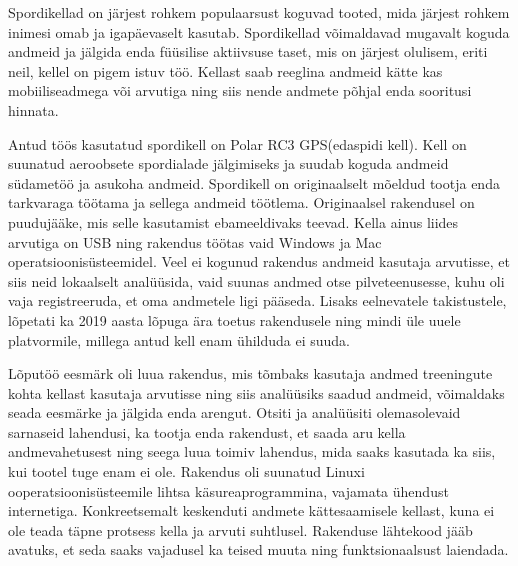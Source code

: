 Spordikellad on järjest rohkem populaarsust koguvad tooted, mida järjest rohkem inimesi omab ja igapäevaselt kasutab.
Spordikellad võimaldavad mugavalt koguda andmeid ja jälgida enda füüsilise aktiivsuse taset, mis on järjest olulisem, eriti neil, kellel on pigem istuv töö.
Kellast saab reeglina andmeid kätte kas mobiiliseadmega või arvutiga ning siis nende andmete põhjal enda sooritusi hinnata.

Antud töös kasutatud spordikell on Polar RC3 GPS(edaspidi kell).
Kell on suunatud aeroobsete spordialade jälgimiseks ja suudab koguda andmeid südametöö ja asukoha andmeid.
Spordikell on originaalselt mõeldud tootja enda tarkvaraga töötama ja sellega andmeid töötlema.
Originaalsel rakendusel on puudujääke, mis selle kasutamist ebameeldivaks teevad.
Kella ainus liides arvutiga on USB ning rakendus töötas vaid Windows ja Mac operatsioonisüsteemidel.
Veel ei kogunud rakendus andmeid kasutaja arvutisse, et siis neid lokaalselt analüüsida, vaid suunas andmed otse pilveteenusesse, kuhu oli vaja registreeruda, et oma andmetele ligi pääseda.
Lisaks eelnevatele takistustele, lõpetati ka 2019 aasta lõpuga\cite{polar-ws-discontinued} ära toetus rakendusele ning mindi üle uuele platvormile, millega antud kell enam ühilduda ei suuda.

Lõputöö eesmärk oli luua rakendus, mis tõmbaks kasutaja andmed treeningute kohta kellast kasutaja arvutisse ning siis analüüsiks saadud andmeid, võimaldaks seada eesmärke ja jälgida enda arengut.
Otsiti ja analüüsiti olemasolevaid sarnaseid lahendusi, ka tootja enda rakendust, et saada aru kella andmevahetusest ning seega luua toimiv lahendus, mida saaks kasutada ka siis, kui tootel tuge enam ei ole.
Rakendus oli suunatud Linuxi ooperatsioonisüsteemile lihtsa käsureaprogrammina, vajamata ühendust internetiga.
Konkreetsemalt keskenduti andmete kättesaamisele kellast, kuna ei ole teada täpne protsess kella ja arvuti suhtlusel.
Rakenduse lähtekood jääb avatuks, et seda saaks vajadusel ka teised muuta ning funktsionaalsust laiendada.

